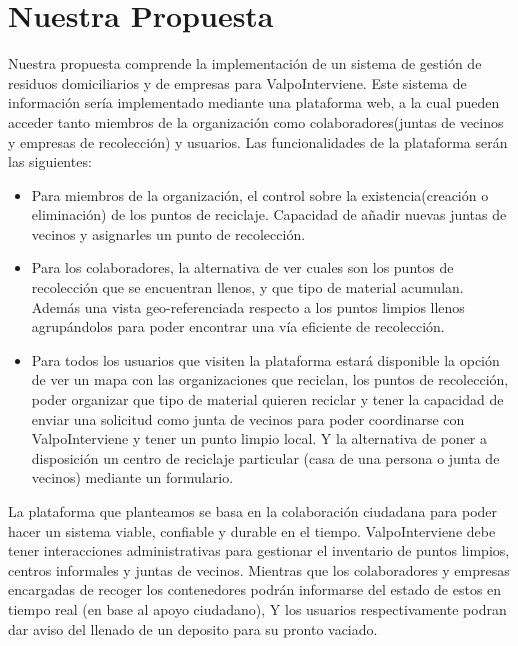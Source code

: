 \documentclass[paper=letter, fontsize=11pt]{scrartcl} %
\numberwithin{equation}{section} %
\numberwithin{figure}{section} %
\numberwithin{table}{section} %
\begin{document}
\section{Nuestra Propuesta}
Nuestra propuesta comprende la implementación de un sistema de gestión de residuos domiciliarios y de empresas para ValpoInterviene. Este sistema de información sería implementado mediante una plataforma web, a la cual pueden acceder tanto miembros de la organización como colaboradores(juntas de vecinos y empresas de recolección) y usuarios. Las funcionalidades de la plataforma serán las siguientes:
\begin{itemize}
\item Para miembros de la organización, el control sobre la existencia(creación o eliminación) de los puntos de reciclaje. Capacidad de añadir nuevas juntas de vecinos y asignarles un punto de recolección.
\item Para los colaboradores, la alternativa de ver cuales son los puntos de recolección que se encuentran llenos, y que tipo de material acumulan. Además una vista geo-referenciada respecto a los puntos limpios llenos agrupándolos para poder encontrar una vía eficiente de recolección.
\item Para todos los usuarios que visiten la plataforma estará disponible la opción de ver un mapa con las organizaciones que reciclan, los puntos de recolección, poder organizar que tipo de material quieren reciclar y tener la capacidad de enviar una solicitud como junta de vecinos para poder coordinarse con ValpoInterviene y tener un punto limpio local. Y la alternativa de poner a disposición un centro de reciclaje particular (casa de una persona o junta de vecinos) mediante un formulario. 
\end{itemize}

La plataforma que planteamos se basa en la colaboración ciudadana para poder hacer un sistema viable, confiable y durable en el tiempo. ValpoInterviene debe tener interacciones administrativas para gestionar
el inventario de puntos limpios, centros informales y juntas de vecinos. Mientras que los colaboradores y
empresas encargadas de recoger los contenedores podrán informarse del estado de estos en tiempo real
(en base al apoyo ciudadano), Y los usuarios respectivamente podran dar aviso del llenado de un deposito para su pronto vaciado.\\




\end{document}
